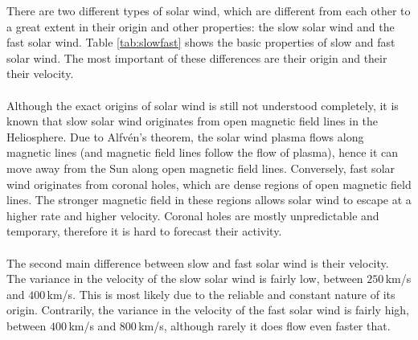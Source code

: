 \documentclass[12pt]{article}
\begin{document}
        There are two different types of solar wind, which are different from each other to a great extent in their origin and other properties: the slow solar wind and the fast solar wind. Table \ref{tab:slowfast} shows the basic properties of slow and fast solar wind. The most important of these differences are their origin and their their velocity.\\ \\
        Although the exact origins of solar wind is still not understood completely, it is known that slow solar wind originates from open magnetic field lines in the Heliosphere. Due to Alfvén's theorem\cite{1976alfven}, the solar wind plasma flows along magnetic lines (and magnetic field lines follow the flow of plasma), hence it can move away from the Sun along open magnetic field lines. Conversely, fast solar wind originates from coronal holes, which are dense regions of open magnetic field lines. The stronger magnetic field in these regions allows solar wind to escape at a higher rate and higher velocity. Coronal holes are mostly unpredictable and temporary, therefore it is hard to forecast their activity.\\ \\
        The second main difference between slow and fast solar wind is their velocity. The variance in the velocity of the slow solar wind is fairly low, between $250\,$km/s and $400\,$km/s. This is most likely due to the reliable and constant nature of its origin. Contrarily, the variance in the velocity of the fast solar wind is fairly high, between $400\,$km/s and $800\,$km/s, although rarely it does flow even faster that.
\end{document}
